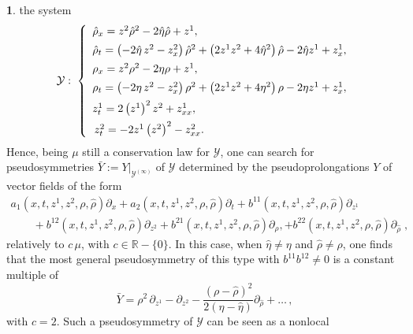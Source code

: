 \documentclass[12pt,english]{elsarticle}
\theoremstyle{plain}
\theoremstyle{plain}
\theoremstyle{remark}
\theoremstyle{plain}
\theoremstyle{definition}
\theoremstyle{definition}
\newtheorem{example}[thm]{\protect\examplename}
\providecommand{\examplename}{Example}
\begin{document}
\begin{example}
the system
%
\begin{equation*}
\mathcal{Y}:\;\left \{
%
\begin{array}{l}
\hat{\rho}_{x}=z^{2}\hat{\rho}^{2}-2\hat{\eta}\hat{\rho}+z^{1},
\vspace{5pt}
\\
\hat{\rho}_{t}=\left (-2\hat{\eta}\,z^{2}-z_{x}^{2}\right )\hat{\rho}^{2}+
\left (2z^{1}z^{2}+4\hat{\eta}^{2}\right )\hat{\rho}-2\hat{\eta}z^{1}+z_{x}^{1},
\vspace{5pt}
\\
\rho _{x}=z^{2}\rho ^{2}-2\eta \rho +z^{1},
\vspace{5pt}
\\
\rho _{t}=\left (-2\eta \,z^{2}-z_{x}^{2}\right )\rho ^{2}+\left (2z^{1}z^{2}+4
\eta ^{2}\right )\rho -2\eta z^{1}+z_{x}^{1},
\vspace{5pt}
\\
z_{t}^{1}=2\left (z^{1}\right )^{2}z^{2}+z_{xx}^{1},
\vspace{5pt}
\\
\,z_{t}^{2}=-2z^{1}\left (z^{2}\right )^{2}-z_{xx}^{2}.
\end{array}
%
\right .
\end{equation*}
%
Hence, being $\mu $ still a conservation law for $\mathcal{Y}$, one can
search for pseudosymmetries
$\bar{Y}:=\left .Y\right |_{\mathcal{Y}^{(\infty )}}$ of
$\mathcal{Y}$ determined by the pseudoprolongations $Y$ of vector fields
of the form
%
\begin{eqnarray*}[ll]
a_{1}(x,t,z^{1},z^{2},\rho ,\hat{\rho})\partial _{x}+a_{2}(x,t,z^{1},z^{2},
\rho ,\hat{\rho})\partial _{t}+b^{11}(x,t,z^{1},z^{2},\rho ,
\hat{\rho})\partial _{z^{1}}\\
\qquad +b^{12}(x,t,z^{1},z^{2},\rho ,\hat{\rho})
\partial _{z^{2}}
+b^{21}(x,t,z^{1},z^{2},\rho ,\hat{\rho})\partial _{\rho},+b^{22}(x,t,z^{1},z^{2},
\rho ,\hat{\rho})\partial _{\hat{\rho}}\;,
\end{eqnarray*}
%
relatively to $c\,\mu $, with $c\in \mathbb{R}-\{0\}$. In this case, when
$\hat{\eta}\neq \eta $ and $\hat{\rho}\neq \rho $, one finds that the most
general pseudosymmetry of this type with $b^{11}b^{12}\neq 0$ is a constant
multiple of
%
\begin{equation*}
\bar{Y}=\rho ^{2}\,\partial _{z^{1}}-\partial _{z^{2}}-
\frac{\left (\rho -\hat{\rho}\right )^{2}}{2(\eta -\hat{\eta})}
\partial _{\hat{\rho}}+\ldots \,,
\end{equation*}
%
with $c=2$. Such a pseudosymmetry of $\mathcal{Y}$ can be seen as a nonlocal

\end{example}
\end{document}
